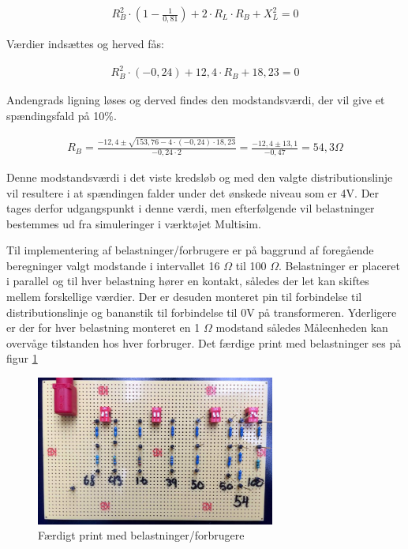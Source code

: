 \begin{align}
R_B^2\cdot (1-\frac{1}{0,81})+2\cdot R_L\cdot R_B+X_L^2=0
\end{align}

Værdier indsættes og herved fås:

\begin{align}
R_B^2\cdot (-0,24) +12,4\cdot R_B+18,23=0
\end{align}

Andengrads ligning løses og derved findes den modstandsværdi, der vil give et spændingsfald på 10\%.

\begin{align}
R_B=\frac{-12,4\pm\sqrt{153,76-4\cdot(-0,24)\cdot18,23}}{-0,24\cdot 2}=\frac{-12,4\pm 13,1}{-0,47}=54,3 \Omega
\end{align}

Denne modstandsværdi i det viste kredsløb og med den valgte distributionslinje vil resultere i at spændingen falder under det ønskede niveau som er 4V. Der tages derfor udgangspunkt i denne værdi, men efterfølgende vil belastninger bestemmes ud fra simuleringer i værktøjet Multisim. 

Til implementering af belastninger/forbrugere er på baggrund af foregående beregninger valgt modstande i intervallet 16 $\Omega$ til 100 $\Omega$. Belastninger er placeret i parallel og til hver belastning hører en kontakt, således der let kan skiftes mellem forskellige værdier. Der er desuden monteret pin til forbindelse til distributionslinje og bananstik til forbindelse til 0V på transformeren. Yderligere er der for hver belastning monteret en 1 $\Omega$ modstand således Måleenheden kan overvåge tilstanden hos hver forbruger. Det færdige print med belastninger ses på figur \ref{fig:Belastning1}

\begin{figure}[H] 
	\centering
	\includegraphics[width=0.7\textwidth]{Figure/Belastningskreds}
	\caption{Færdigt print med belastninger/forbrugere}
	\label{fig:Belastning1}
\end{figure}



